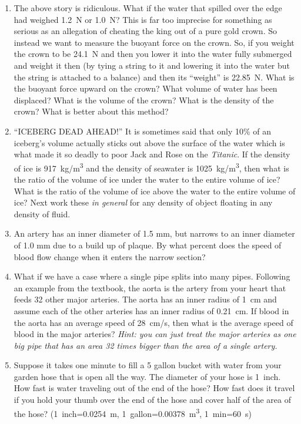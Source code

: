 \begin{enumerate}
	\item
	The above story is ridiculous. What if the water that spilled over the edge had weighed \SI{1.2}{\newton} or \SI{1.0}{\newton}? This is far too imprecise for something as serious as an allegation of cheating the king out of a pure gold crown. So instead we want to measure the buoyant force on the crown. So, if you weight the crown to be \SI{24.1}{\newton} and then you lower it into the water fully submerged and weight it then (by tying a string to it and lowering it into the water but the string is attached to a balance) and then its ``weight'' is \SI{22.85}{\newton}. What is the buoyant force upward on the crown? What volume of water has been displaced? What is the volume of the crown? What is the density of the crown? What is better about this method?
	
	\item
	``ICEBERG DEAD AHEAD!'' It is sometimes said that only 10\% of an iceberg's volume actually sticks out above the surface of the water which is what made it so deadly to poor Jack and Rose on the \emph{Titanic}. If the density of ice is \SI{917}{\kg/m^3} and the density of seawater is \SI{1025}{kg/m^3}, then what is the ratio of the volume of ice under the water to the entire volume of ice? What is the ratio of the volume of ice above the water to the entire volume of ice?  Next work these \emph{in general} for any density of object floating in any density of fluid. 
	
	\item
	An artery has an inner diameter of 1.5 mm, but narrows to an inner diameter of 1.0 mm due to a build up of plaque. By what percent does the speed of blood flow change when it enters the narrow section?
	
	\item 
	What if we have a case where a single pipe splits into many pipes. Following an example from the textbook, the aorta is the artery from your heart that feeds 32 other major arteries. The aorta has an inner radius of \SI{1}{cm} and assume each of the other arteries has an inner radius of \SI{0.21}{cm}. If blood in the aorta has an average speed of \SI{28}{cm/s}, then what is the average speed of blood in the major arteries? \emph{Hint: you can just treat the major arteries as one big pipe that has an area 32 times bigger than the area of a single artery.}
	
	\item
	Suppose it takes one minute to fill a 5 gallon bucket with water from your garden hose that is open all the way. The diameter of your hose is \SI{1}{inch}. How fast is water traveling out of the end of the hose? How fast does it travel if you hold your thumb over the end of the hose and cover half of the area of the hose? (\SI{1}{inch}=\SI{0.0254}{m}, \SI{1}{gallon}=\SI{0.00378}{m^3}, \SI{1}{min}=\SI{60}{s})
	

\end{enumerate}
